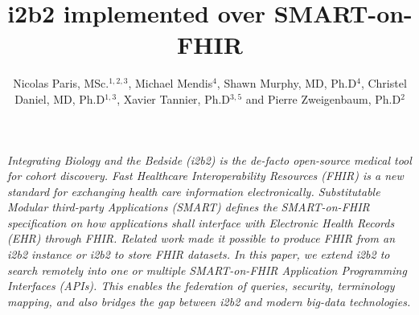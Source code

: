 \documentclass{amia}
\begin{document}
\title{i2b2 implemented over SMART-on-FHIR} 
\author{Nicolas Paris, MSc.$^{1,2,3}$, Michael Mendis$^{4}$, Shawn Murphy, MD, Ph.D$^{4}$, Christel Daniel, MD, Ph.D$^{1,3}$, Xavier Tannier, Ph.D$^{3,5}$ and Pierre Zweigenbaum, Ph.D$^{2}$
}


\maketitle


\textit{Integrating Biology and the Bedside (i2b2) is the de-facto open-source medical tool for cohort discovery. Fast Healthcare Interoperability Resources (FHIR) is a new standard for exchanging health care information electronically. Substitutable Modular third-party Applications (SMART) defines the SMART-on-FHIR specification on how applications shall interface with Electronic Health Records (EHR) through FHIR. Related work made it possible to produce FHIR from an i2b2 instance or i2b2 to store FHIR datasets. In this paper, we extend i2b2 to search remotely into one or multiple SMART-on-FHIR Application Programming Interfaces (APIs). This enables the federation of queries, security, terminology mapping, and also bridges the gap between i2b2 and modern big-data technologies.}
\end{document}
